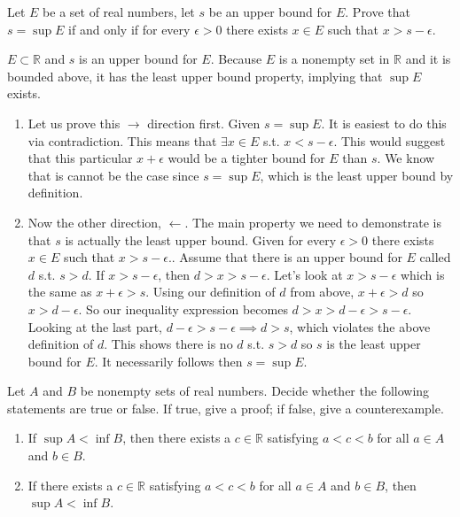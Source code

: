 \documentclass[12pt,letterpaper,boxed]{hmcpset}
\begin{document}
\begin{problem}[Exercise 4.9.]
Let $E$ be a set of real numbers, let $s$ be an upper bound for $E$. Prove that $s = \sup E$ if and only if for every $\epsilon > 0$ there exists $x \in E$ such that $x > s - \epsilon.$
\end{problem}

\begin{solution}
$E \subset \mathbb{R}$ and $s$ is an upper bound for $E$. Because $E$ is a nonempty set in $\mathbb{R}$ and it is bounded above, it has the least upper bound property, implying that $\sup E$ exists.  
\begin{enumerate}
		\itemsep0em
		\item Let us prove this $\rightarrow$ direction first. Given $s = \sup E$. It is easiest to do this via contradiction. This means that $\exists x \in E$ s.t. $x < s - \epsilon$. This would suggest that this particular $x + \epsilon$ would be a tighter bound for $E$ than $s$. We know that is cannot be the case since $s = \sup E$, which is the least upper bound by definition. 
		\item Now the other direction, $\leftarrow$. The main property we need to demonstrate is that $s$ is actually the least upper bound. Given for every $\epsilon > 0$ there exists $x \in E$ such that $x > s - \epsilon.$. Assume that there is an upper bound for $E$ called $d$ s.t. $s > d.$ If $x > s - \epsilon$, then $d > x > s - \epsilon$. Let's look at $x > s - \epsilon$ which is the same as $x + \epsilon > s$. Using our definition of $d$ from above, $x + \epsilon > d$ so $x > d - \epsilon$. So our inequality expression becomes $d > x > d - \epsilon > s - \epsilon$. Looking at the last part, $d - \epsilon > s - \epsilon \implies d > s$, which violates the above definition of $d$. This shows there is no $d$ s.t. $s > d$ so $s$ is the least upper bound for $E$. It necessarily follows then $s = \sup E$.
\end{enumerate}	

\end{solution}

\begin{problem}[Exercise 4.10.]
Let $A$ and $B$ be nonempty sets of real numbers. Decide whether the following statements are true or false. If true, give a proof; if false, give a counterexample.
\begin{enumerate}
	\itemsep0em
	\item If $\sup A < \inf B$, then there exists a $c \in \mathbb{R}$ satisfying $a < c < b$ for all $a \in A$ and $b \in B$.
	\item If there exists a $c\in \mathbb{R}$ satisfying $a < c < b$ for all $a \in A$ and $b \in B$, then $\sup A < \inf B$.
\end{enumerate}
\end{problem}
\end{document}
